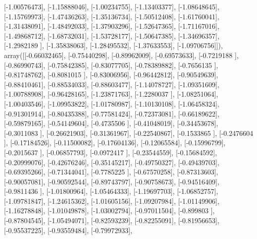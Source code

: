 \documentclass{article}
\begin{document}
       [-1.00576473],
       [-1.15888046],
       [-1.00234755],
       [-1.13403377],
       [-1.08648645],
       [-1.15769973],
       [-1.47436263],
       [-1.35136734],
       [-1.50512408],
       [-1.61760041],
       [-1.31438091],
       [-1.48492033],
       [-1.37903296],
       [-1.52647365],
       [-1.71167016],
       [-1.49868712],
       [-1.68732031],
       [-1.53728177],
       [-1.50647385],
       [-1.34696357],
       [-1.2982189 ],
       [-1.35838063],
       [-1.28495532],
       [-1.37633553],
       [-1.09706756]]), array([[-0.66032465],
       [-0.75440298],
       [-0.89962009],
       [-0.69573633],
       [-0.7219188 ],
       [-0.86990743],
       [-0.75842385],
       [-0.83077705],
       [-0.78389882],
       [-0.7656135 ],
       [-0.81748762],
       [-0.8081015 ],
       [-0.83006956],
       [-0.96442812],
       [-0.90549639],
       [-0.88410461],
       [-0.88534033],
       [-0.88603477],
       [-1.14078727],
       [-1.09351609],
       [-1.00788908],
       [-0.96428165],
       [-1.23871763],
       [-1.2280037 ],
       [-1.08251064],
       [-1.00403546],
       [-1.09953822],
       [-1.01780987],
       [-1.10130108],
       [-1.06458324],
       [-0.91301914],
       [-0.80435388],
       [-0.77581424],
       [-0.72373081],
       [-0.66189622],
       [-0.59879165],
       [-0.54149604],
       [-0.4735506 ],
       [-0.41048019],
       [-0.34453678],
       [-0.3011083 ],
       [-0.26621903],
       [-0.31361967],
       [-0.22540867],
       [-0.1533865 ],
       [-0.2476604 ],
       [-0.17184526],
       [-0.11500082],
       [-0.17604136],
       [-0.12065584],
       [-0.15996799],
       [-0.2015637 ],
       [-0.06857793],
       [-0.0972417 ],
       [-0.23544559],
       [-0.15684592],
       [-0.20999076],
       [-0.42676246],
       [-0.35145217],
       [-0.49750327],
       [-0.49439703],
       [-0.69395266],
       [-0.71344041],
       [-0.7785225 ],
       [-0.67570258],
       [-0.87313603],
       [-0.90057081],
       [-0.90592544],
       [-0.89743797],
       [-0.90758673],
       [-0.94516409],
       [-0.9811436 ],
       [-1.01800964],
       [-1.05464333],
       [-1.19697703],
       [-1.06852757],
       [-1.09781847],
       [-1.24615362],
       [-1.01605156],
       [-1.09207984],
       [-1.01149906],
       [-1.16278848],
       [-1.01049878],
       [-1.03002794],
       [-0.97011504],
       [-0.899803  ],
       [-0.87804545],
       [-1.05494071],
       [-0.82593239],
       [-0.82255091],
       [-0.81956653],
       [-0.95537225],
       [-0.93559484],
       [-0.79972933],
\end{document}

